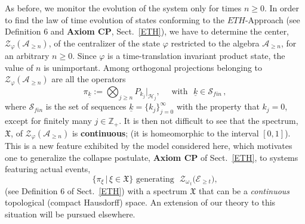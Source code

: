 \documentclass[a4paper,11pt]{article}
\begin{document}
{As before, we monitor the evolution of the system only for times $n\geq 0$. In order to find the law of time evolution of 
states conforming to the $ETH$-Approach (see Definition 6 and {\bf{Axiom CP}}, Sect.~\ref{ETH}), we have to 
determine the center, $\mathcal{Z}_{\varphi}(\mathcal{A}_{\geq n})$, of the centralizer of the state $\varphi$ 
restricted to the algebra $\mathcal{A}_{\geq n}$, for an arbitrary $n\geq 0$. Since $\varphi$ is a time-translation 
invariant product state, the value of $n$ is unimportant. Among orthogonal projections belonging to 
$\mathcal{Z}_{\varphi}(\mathcal{A}_{\geq n})$ are all the operators
\begin{equation}\label{central proj}
\pi_{\underline{k}} := \bigotimes_{j\geq n} P_{k_j}\vert_{\mathcal{H}_j}, \quad \text{  with  }\,\,\underline{k}\in \mathcal{S}_{fin}\,,
\end{equation}
where $\mathcal{S}_{fin}$ is the set of sequences $\underline{k}=\big\{k_j\big\}_{j=0}^{\infty}$ with the property that 
$k_j =0$, except for finitely many $j\in \mathbb{Z}_{+}$.
It is then not difficult to see that the spectrum, $\mathfrak{X}$, of $\mathcal{Z}_{\varphi}(\mathcal{A}_{\geq n})$ 
is {\bf{continuous}}; (it is homeomorphic to the interval $[0,1]$). This is a new feature exhibited by the model considered 
here, which motivates one to generalize the collapse postulate, {\bf{Axiom CP}} of Sect.~\ref{ETH}, to systems 
featuring actual events, 
$$\big\{ \pi_{\xi}\,\vert \,\xi \in \mathfrak{X} \big\} \,\,\text{generating   }\,\, \mathcal{Z}_{\omega_{\,t}}\big(\mathcal{E}_{\geq t}\big),$$
(see Definition 6 of Sect.~\ref{ETH}) with a spectrum $\mathfrak{X}$ that can be a \textit{continuous} topological (compact Hausdorff) space. An extension of our theory to this situation will be pursued elsewhere.

}
\end{document}
